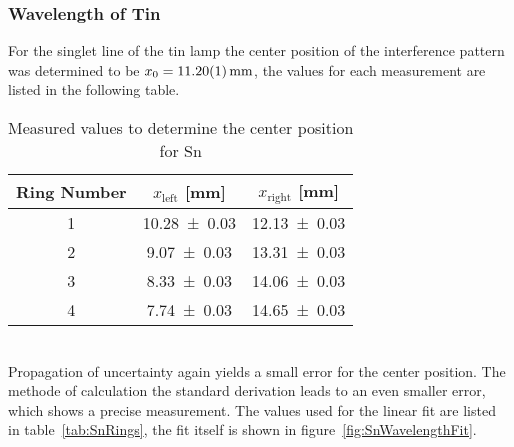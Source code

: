 \subsubsection{Wavelength of Tin}
\label{toc:WavelengthSn}
For the singlet line of the tin lamp the center position of the interference pattern was determined to be $x_0 = \SI{11.20 \pm 0.01}{\mm}$, the values for each measurement are listed in the following table.
\begin{table}[ht]
	\centering
	\begin{tabular}{c c c}
	Ring Number		& $x_\text{left}$ [\si{\mm}]	& $x_\text{right}$ [\si{\mm}]	\\
	\hline
	1			& \num{10.28 \pm 0.03} 		& \num{12.13 \pm 0.03}		 \\
	2			& \num{9.07 \pm 0.03} 		& \num{13.31 \pm 0.03}		 \\
	3			& \num{8.33 \pm 0.03} 		& \num{14.06 \pm 0.03}		 \\
	4			& \num{7.74 \pm 0.03} 		& \num{14.65 \pm 0.03}		 \\
	\end{tabular}
	\caption[Measurement - Center Position Sn]{Measured values to determine the center position for Sn}
	\label{tab:SnCenter}
\end{table}\\
Propagation of uncertainty again yields a small error for the center position. 
The methode of calculation the standard derivation leads to an even smaller error, which shows a precise measurement. 
The values used for the linear fit are listed in table~\ref{tab:SnRings}, the fit itself is shown in figure~\ref{fig:SnWavelengthFit}.
